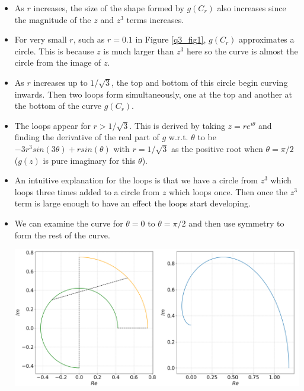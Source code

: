 \documentclass[12pt, a4paper]{article}
\begin{document}
\begin{itemize}[topsep = 8pt, leftmargin = *]
	\itemsep 0em
	\item As $r$ increases, the size of the shape formed by $g(C_{r})$ also increases since the magnitude of the $z$ and $z^{3}$ terms increases.
	\item For very small $r$, such as $r=0.1$ in Figure \ref{q3_fig1}, $g(C_{r})$ approximates a circle. This is because $z$ is much larger than $z^{3}$ here so the curve is almost the circle from the image of $z$. 
	\item As $r$ increases up to $1$/$\sqrt3$, the top and bottom of this circle begin curving inwards. Then two loops form simultaneously, one at the top and another at the bottom of the curve $g(C_{r})$.
	\item The loops appear for $r>1$/$\sqrt3$. This is derived by taking $z=re^{i\theta}$ and finding the derivative of the real part of $g$ w.r.t. $\theta$ to be $-3r^{3}sin(3\theta)+rsin(\theta)$ with $r=1$/$\sqrt3$ as the positive root when $\theta=\pi/2$ ($g(z)$ is pure imaginary for this $\theta$).
	\item An intuitive explanation for the loops is that we have a circle from $z^3$ which loops three times added to a circle from $z$ which loops once. Then once the $z^{3}$ term is large enough to have an effect the loops start developing.
	\item We can examine the curve for $\theta=0$ to $\theta=\pi/2$ and then use symmetry to form the rest of the curve.\vspace{0.2cm}\\
	\begin{minipage}{\textwidth}
		\centering
		\includegraphics[width=0.75\linewidth]{q3_fig2}

\end{minipage}
\end{itemize}
\end{document}
